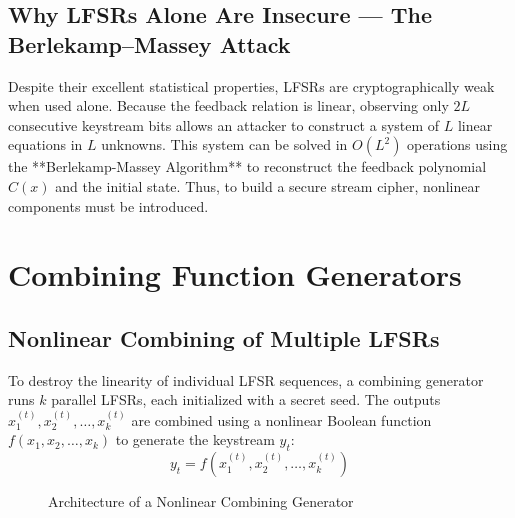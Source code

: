 \subsection{Why LFSRs Alone Are Insecure — The Berlekamp–Massey Attack}
Despite their excellent statistical properties, LFSRs are cryptographically weak when used alone. Because the feedback relation is linear, observing only $2L$ consecutive keystream bits allows an attacker to construct a system of $L$ linear equations in $L$ unknowns. This system can be solved in $O(L^2)$ operations using the **Berlekamp-Massey Algorithm** to reconstruct the feedback polynomial $C(x)$ and the initial state. Thus, to build a secure stream cipher, nonlinear components must be introduced.

\section{Combining Function Generators}
\label{sec:combining_generators}

\subsection{Nonlinear Combining of Multiple LFSRs}
To destroy the linearity of individual LFSR sequences, a combining generator runs $k$ parallel LFSRs, each initialized with a secret seed. The outputs $x_1^{(t)}, x_2^{(t)}, \dots, x_k^{(t)}$ are combined using a nonlinear Boolean function $f(x_1, x_2, \dots, x_k)$ to generate the keystream $y_t$:
$$y_t = f(x_1^{(t)}, x_2^{(t)}, \dots, x_k^{(t)})$$

\begin{figure}[h]
\centering
{}
\caption{Architecture of a Nonlinear Combining Generator}
\label{fig:combining_generator}
\end{figure}

